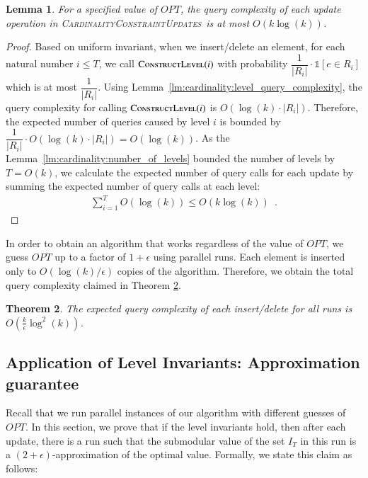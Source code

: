 \documentclass[11pt]{article}
\newtheorem{theorem}{Theorem}
\newtheorem{lemma}[theorem]{Lemma}
\newcommand{\mO}{O}
\newcommand{\ind}[1]{\ensuremath{\mathds{1}\left[#1\right]}}
\newcommand{\constLevel}{\textsc{ConstructLevel}}
\newcommand{\carupdates}{\textsc{CardinalityConstraintUpdates}}
\begin{document}
\begin{lemma}
  For a specified value of $OPT$, the query complexity of each update operation in \carupdates~is at most
  $\mO\left(k\log\left(k\right)\right)$.
\end{lemma}
\begin{proof}
  Based on uniform invariant, when we insert/delete an element, for each natural number $i \le T$, we call $\constLevel{}(i)$ with probability $\dfrac{1}{|R_i|} \cdot \ind{e \in R_i}$ which is at most $\dfrac{1}{|R_i|}$. 
  Using Lemma~\ref{lm:cardinality:level_query_complexity}, the query complexity for calling $\constLevel{}(i)$ is $\mO\left(\log\left(k\right)\cdot|R_i|\right)$. Therefore, the expected number of queries caused by level $i$ is bounded by $\dfrac{1}{|R_i|} \cdot \mO\left(\log\left(k\right)\cdot|R_i|\right) = \mO\left(\log\left(k\right)\right)$.
  As the Lemma~\ref{lm:cardinality:number_of_levels} bounded the number of levels by $T = O\left(k\right)$, we calculate the expected number of query calls for each update by summing the expected number of query calls at each level:
  \begin{align*}
      \sum_{i=1}^T \mO\left(\log\left(k\right)\right) \le \mO\left(k\log\left(k\right)\right) \enspace .
  \end{align*}
\end{proof}

In order to obtain an algorithm that works regardless of the value of $OPT$, we guess $OPT$ up to a factor of $1+\epsilon$ using parallel runs.
Each element is inserted only to $\mO(\log(k)/\epsilon)$ copies of the algorithm. Therefore, we obtain the total query complexity claimed in Theorem \ref{thm:cardinality:query_complexity}.

\begin{theorem}
\label{thm:cardinality:query_complexity}
The expected query complexity of each insert/delete for all runs is $\mO\left(\frac{k}{\epsilon}\log^2\left(k\right)\right)$.
\end{theorem}



\subsection{Application of Level Invariants: Approximation guarantee}

Recall that we run parallel instances of our algorithm with different guesses of $OPT$.
In this section, we prove that if the level invariants hold, then after each update, there is a run such that the submodular value of the set $I_T$ in this run is a $(2+\epsilon)$-approximation 
of the optimal value. Formally, we state this claim as follows: 
\end{document}
